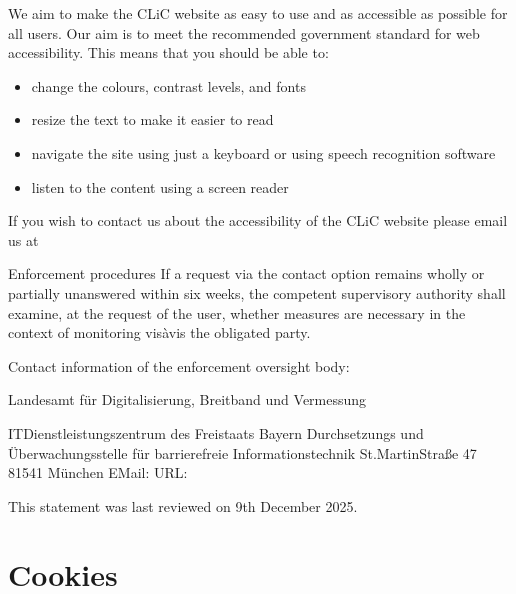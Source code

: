 \documentclass[letterpaper,10pt,english]{sphinxmanual}
\begin{document}
\sphinxAtStartPar
We aim to make the CLiC website as easy to use and as accessible as possible for all users. Our aim is to meet the recommended government standard for web accessibility. This means that you should be able to:
\begin{itemize}
\item {} 
\sphinxAtStartPar
change the colours, contrast levels, and fonts

\item {} 
\sphinxAtStartPar
resize the text to make it easier to read

\item {} 
\sphinxAtStartPar
navigate the site using just a keyboard or using speech recognition software

\item {} 
\sphinxAtStartPar
listen to the content using a screen reader

\end{itemize}

\sphinxAtStartPar
If you wish to contact us about the accessibility of the CLiC website please email us at 

\sphinxAtStartPar
Enforcement procedures
If a request via the contact option remains wholly or partially unanswered within six weeks, the competent supervisory authority shall examine, at the request of the user, whether measures are necessary in the context of monitoring vis\sphinxhyphen{}à\sphinxhyphen{}vis the obligated party.

\sphinxAtStartPar
Contact information of the enforcement oversight body:

\sphinxAtStartPar
Landesamt für Digitalisierung, Breitband und Vermessung

\sphinxAtStartPar
IT\sphinxhyphen{}Dienstleistungszentrum des Freistaats Bayern \sphinxhyphen{} Durchsetzungs\sphinxhyphen{} und Überwachungsstelle für barrierefreie Informationstechnik
St.\sphinxhyphen{}Martin\sphinxhyphen{}Straße 47
81541 München
EMail: 
URL: 

\sphinxAtStartPar
This statement was last reviewed on 9th December 2025.

\sphinxstepscope


\section{Cookies}
\label{\detokenize{policies/cookies:cookies}}\label{\detokenize{policies/cookies::doc}}
\end{document}
